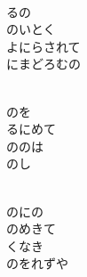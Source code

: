 \documentclass[10pt,b5j]{tarticle} %
\begin{document}
\vspace{1.5em} %
\newcommand{\linespace}{0.5em} %
\newcommand{\blocksize}{0.5\hsize} %
\newcommand{\itemmargin}{3em} %
\begin{enumerate} %
    \setlength{\itemindent}{\itemmargin} %
    \begin{minipage}[c]{\blocksize}
    
        \vspace{\linespace}
        \item~\\
        るの\\
        のいとく\\
        よにらされて\\
        にまどろむの
        
    \end{minipage}
    \begin{minipage}[c]{\blocksize}
        
        \vspace{\linespace}
        \item~\\
        のを\\
        るにめて\\
        ののは\\
        のし
        
    \end{minipage}
    \begin{minipage}[c]{\blocksize}
        
        \vspace{\linespace}
        \item~\\
        のにの\\
        のめきて\\
        くなき\\
        のをれずや
        

\end{minipage}
\end{enumerate}
\end{document}

